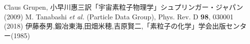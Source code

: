 \documentclass[dvipdfmx]{jsarticle}
\begin{document}



\begin{thebibliography}{10}
     Claus Grupen, 小早川惠三訳「宇宙素粒子物理学」シュプリンガー・ジャパン(2009)
     M. Tanabashi \textit{et al.} (Particle Data Group), Phys. Rev. D \textbf{98}, 030001 (2018)
     伊藤泰男,鍛冶東海,田畑米穂,吉原賢二,「素粒子の化学」学会出版センター(1985)
\end{thebibliography}
\end{document}
